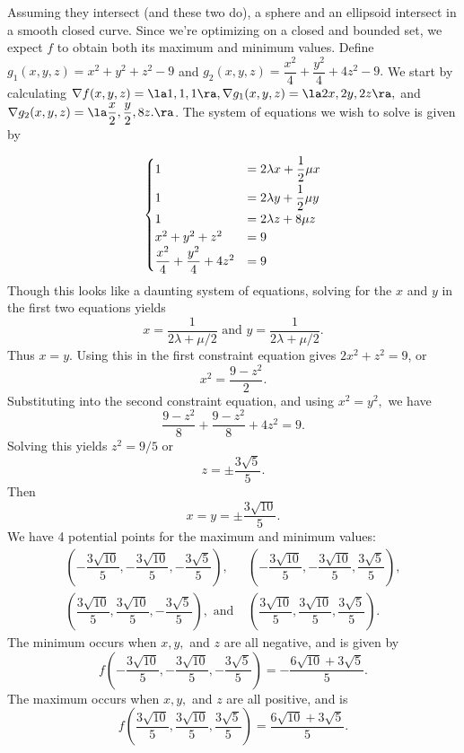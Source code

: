 {Assuming they intersect (and these two do), a sphere and an ellipsoid intersect in a smooth closed curve.  Since we're optimizing on a closed and bounded set, we expect $f$ to obtain both its maximum and minimum values.  Define $g_1(x,y,z) = x^2 + y^2 + z^2 -  9$ and $g_2(x,y,z) = \dfrac{x^2}{4} + \dfrac{y^2}{4} + 4z^2 - 9.$ We start by calculating $\nabla f(x,y,z) = \la 1,1,1 \ra, \nabla g_1(x,y,z) = \la 2x,2y,2z\ra,$ and $\nabla g_2(x,y,z) = \la \dfrac{x}{2}, \dfrac{y}{2}, 8z. \ra$.  The system of equations we wish to solve is given by

\[
		\begin{cases}
			                                     1 & = 2\lambda x + \dfrac{1}{2}\mu x \smallskip \\
			                                     1 & = 2\lambda y + \dfrac{1}{2}\mu y  \\
			                                     1 & =2\lambda z + 8\mu z            \\
			                       x^2 + y^2 + z^2 & = 9                             \\
			\dfrac{x^2}{4} + \dfrac{y^2}{4} + 4z^2 & = 9
		\end{cases}\]
Though this looks like a daunting system of equations, solving for the $x$ and $y$ in the first two equations yields 
\[
	x = \dfrac{1}{2\lambda + \mu/2} \text{ and } y = \dfrac{1}{2\lambda + \mu/2}.
\] 
Thus $x = y$.  Using this in the first constraint equation gives $2x^2 + z^2 = 9$, or
\[
	x^2 = \dfrac{9 - z^2}{2}.
\] 
Substituting into the second constraint equation, and using $x^2 = y^2,$ we have 
\[
	\dfrac{9 - z^2}{8} + \dfrac{9 - z^2}{8} + 4z^2 = 9.
\]
Solving this yields $z^2 = 9/5$ or
\[
	z =\pm \dfrac{3 \sqrt{5}}{5}.
\]
Then
\[
x = y = \pm \dfrac{3\sqrt{10}}{5}.
\]
We have 4 potential points for the maximum and minimum values:
	\[\begin{array}{ll}
	\left(- \dfrac{3\sqrt{10}}{5},-\dfrac{3\sqrt{10}}{5}, -\dfrac{3 \sqrt{5}}{5}\right), & \left(- \dfrac{3\sqrt{10}}{5},-\dfrac{3\sqrt{10}}{5}, \dfrac{3 \sqrt{5}}{5}\right), \\
	\left( \dfrac{3\sqrt{10}}{5},\dfrac{3\sqrt{10}}{5}, -\dfrac{3 \sqrt{5}}{5}\right),  \text{ and } &\left( \dfrac{3\sqrt{10}}{5},\dfrac{3\sqrt{10}}{5}, \dfrac{3 \sqrt{5}}{5}\right). \end{array}
	\]
The minimum occurs when $x, y,$ and $z$ are all negative, and is given by $$f\left(- \dfrac{3\sqrt{10}}{5},-\dfrac{3\sqrt{10}}{5}, -\dfrac{3 \sqrt{5}}{5}\right) = -\dfrac{6\sqrt{10} + 3\sqrt{5}}{5}.$$  The maximum occurs when $x,y,$ and $z$ are all positive, and is $$f\left( \dfrac{3\sqrt{10}}{5},\dfrac{3\sqrt{10}}{5}, \dfrac{3 \sqrt{5}}{5}\right) = \dfrac{6\sqrt{10} + 3\sqrt{5}}{5}.$$
}

